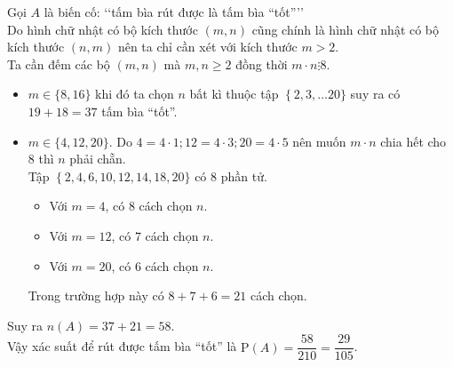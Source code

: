 \begin{ex}
{		Gọi $A$ là biến cố: \lq\lq tấm bìa rút được là tấm bìa “tốt”\rq\rq\. \\
		Do hình chữ nhật có bộ kích thước $(m,n)$ cũng chính là hình chữ nhật có bộ kích thước $(n,m)$ nên ta chỉ cần xét với kích thước $m>2$.\\
		Ta cần đếm các bộ $(m,n)$ mà $m,n \geqslant 2$ đồng thời $m \cdot n \vdots 8$.
		\begin{itemize}
			\item $m \in \{8,16\}$ khi đó ta chọn $n$ bất kì thuộc tập $\left\{2,3,\ldots 20\}\right. $ suy ra có $19+ 18 = 37$ tấm bìa “tốt”.
			\item $m \in \{4,12,20\}$. Do $4=4 \cdot 1;12=4 \cdot 3;20=4 \cdot 5$ nên muốn $m\cdot n$ chia hết cho $8$ thì $n$ phải chẵn.\\
			Tập $\left\{2,4,6,10,12,14,18,20\}\right. $ có $8$ phần tử.
			\begin{itemize}
				\item Với $m = 4$, có $8$ cách chọn $n$.
				\item Với $m = 12$, có $7$ cách chọn $n$.
				\item Với $m = 20$, có $6$ cách chọn $n$.
			\end{itemize}
			Trong trường hợp này có $8 + 7 + 6 = 21$ cách chọn.
		\end{itemize}
		Suy ra $n(A)=37+21=58$.\\
		Vậy xác suất để rút được tấm bìa “tốt” là $\mathrm{P}(A)=\dfrac{58}{210}=\dfrac{29}{105}$.
	}
\end{ex}%
